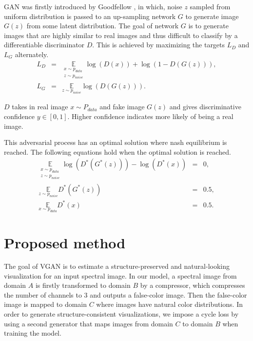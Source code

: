 \documentclass[10pt,conference,a4paper]{IEEEtran}
\begin{document}
GAN was firstly introduced by Goodfellow \cite{goodfellow2014generative}, in which, noise $z$ sampled from uniform distribution is passed to an up-sampling network $G$ to generate image $G(z)$ from some latent distribution. The goal of network $G$ is to generate images that are highly similar to real images and thus difficult to classify by a differentiable discriminator $D$. This is achieved by maximizing the targets $L_D$ and $L_G$ alternately.
\begin{eqnarray}
  \label{eq:ld}
  L_D &=& \underset{\substack{ x\sim p_{data} \\ z\sim p_{noise}} }{\mathbb{E}}  \log(D(x)) + \log \left(1-D(G(z)) \right),\\
  \label{eq:lg}
  L_G &=&  \underset{z\sim p_{noise} }{\mathbb{E}} \log(D(G(z))) .
\end{eqnarray}

$D$ takes in real image $x\sim P_{data}$ and fake image $G(z)$ and gives discriminative confidence $y\in [0,1]$. Higher confidence indicates more likely of being a real image.

This adversarial process has an optimal solution where nash equilibrium is reached. The following equations hold when  the optimal solution is reached.
\begin{eqnarray}
  \underset{\substack{ x\sim p_{data} \\ z\sim p_{noise}} }{\mathbb{E}} \log(D^*(G^*(z))) - \log(D^*(x)) &=& 0 ,\\
  \underset{z\sim p_{noise} }{\mathbb{E}} D^*(G^*(z)) &=& 0.5 ,\\
  \underset{x\sim p_{data} }{\mathbb{E}} D^*(x) &=& 0.5 .
\end{eqnarray}


\section{Proposed method}
\label{sec:proposed_method}
The goal of VGAN is to estimate a structure-preserved and natural-looking visualization for an input spectral image.
In our model, a spectral image from domain $A$ is firstly transformed to domain $B$ by a compressor, which compresses the number of channels to 3 and outputs a false-color image.
Then the false-color image is mapped to domain $C$ where images have natural color distributions.
In order to generate structure-consistent visualizations, we impose a cycle loss  by using a second generator that maps images from domain $C$ to domain $B$ when training the model.
\end{document}
